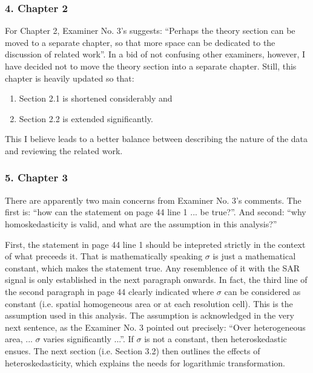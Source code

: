 \subsubsection*{4. Chapter 2}

For Chapter 2, Examiner No. 3's suggests: ``Perhaps the theory section can be moved to a separate chapter, so that more space can be dedicated to the discussion of related work''.
In a bid of not confusing other examiners, however, I have decided not to move the theory section into a separate chapter.
Still, this chapter is heavily updated so that: 
\vspace{-3mm}
\begin{enumerate}
  \item Section 2.1 is shortened considerably and 
  \item Section 2.2 is extended significantly. 
\end{enumerate}

This I believe leads to a better balance between describing the nature of the data and reviewing the related work.

\subsubsection*{5. Chapter 3}

There are apparently two main concerns from Examiner No. 3's comments.
The first is: ``how can the statement on page 44 line 1 ... be true?''.
And second: ``why homoskedasticity is valid, and what are the assumption in this analysis?''

First, the statement in page 44 line 1 should be intepreted strictly in the context of what preceeds it. 
That is mathematically  speaking $\sigma$ is just a mathematical constant, which makes the statement true. 
Any resemblence of it with the SAR signal is only established in the next paragraph onwards.
In fact, the third line of the second paragraph in page 44 clearly indicated where $\sigma$ can be considered as constant (i.e. spatial homogeneous area or at each resolution cell).
This is the assumption used in this analysis. 
The assumption is acknowledged in the very next sentence, as the Examiner No. 3 pointed out precisely: ``Over heterogeneous area, ... $\sigma$ varies significantly ...''.
If $\sigma$ is not a constant, then heteroskedastic ensues.
The next section (i.e. Section 3.2) then outlines the effects of heteroskedasticity, 
  which explains the needs for logarithmic transformation.  

